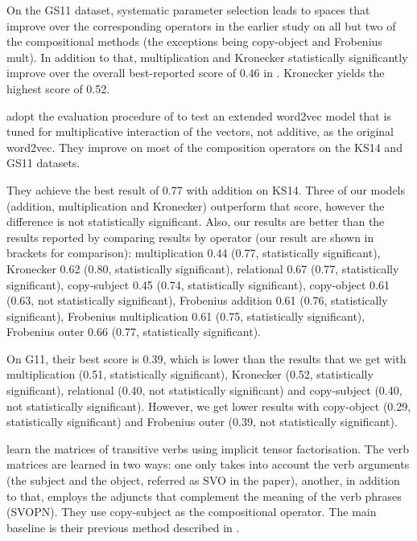 On the GS11 dataset, systematic parameter selection leads to spaces that improve over the corresponding operators in the earlier study on all but two of the compositional methods (the exceptions being copy-object and Frobenius mult). In addition to that, multiplication and Kronecker statistically significantly improve over the overall best-reported score of 0.46 in . Kronecker yields the highest score of 0.52.

 adopt the evaluation procedure of  to test an extended word2vec model that is tuned for multiplicative interaction of the vectors, not additive, as the original word2vec. They improve on most of the composition operators on the KS14 and GS11 datasets.

They achieve the best result of 0.77 with addition on KS14. Three of our models (addition, multiplication and Kronecker) outperform that score, however the difference is not statistically significant. Also, our results are better than the results reported  by comparing results by operator (our result are shown in brackets for comparison): multiplication 0.44 (0.77, statistically significant), Kronecker 0.62 (0.80, statistically significant), relational 0.67 (0.77, statistically significant), copy-subject 0.45 (0.74, statistically significant), copy-object 0.61 (0.63, not statistically significant), Frobenius addition 0.61 (0.76, statistically significant), Frobenius multiplication 0.61 (0.75, statistically significant), Frobenius outer 0.66 (0.77, statistically significant).

On G11, their best score is 0.39, which is lower than the results that we get with multiplication (0.51, statistically significant), Kronecker (0.52, statistically significant), relational (0.40, not  statistically significant) and copy-subject (0.40, not statistically significant). However, we get lower results with copy-object (0.29, statistically significant) and Frobenius outer (0.39, not statistically significant).

 learn the matrices of transitive verbs using implicit tensor factorisation. The verb matrices are learned in two ways: one only takes into account the verb arguments (the subject and the object, referred as SVO in the paper), another, in addition to that, employs the adjuncts that complement the meaning of the verb phrases (SVOPN). They use copy-subject as the compositional operator. The main baseline is their previous method described in .

